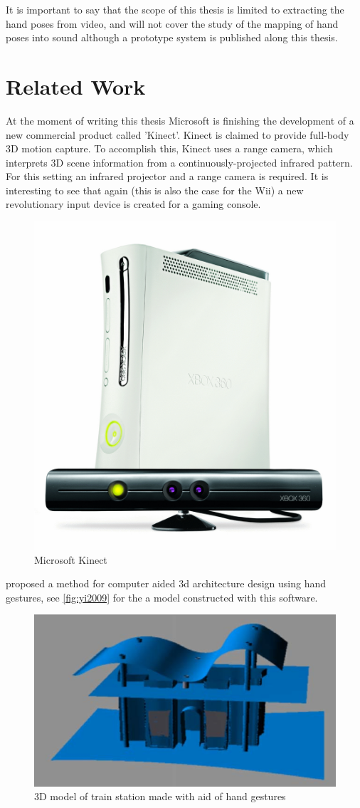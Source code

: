 It is important to say that the scope of this thesis is limited to extracting the hand poses from video, and will not cover the study of the mapping of hand poses into sound although a prototype system is published along this thesis.


\section{Related Work}
At the moment of writing this thesis Microsoft is finishing the development of a new commercial product called 'Kinect'. Kinect is claimed to provide full-body 3D motion capture. To accomplish this, Kinect uses a range camera, which interprets 3D scene information from a continuously-projected infrared pattern. For this setting an infrared projector and a range camera is required. It is interesting to see that again (this is also the case for the Wii) a new revolutionary input device is created for a gaming console. 

\begin{figure}[htbp]
	\center{}
	\includegraphics[width=0.3\linewidth]{figures/wave.jpg}
	\caption{Microsoft Kinect}
	\label{fig:kinect}
\end{figure}

\cite{Yi2009} proposed a method for computer aided 3d architecture design using hand gestures, see \autoref{fig:yi2009} for the a model constructed with this software.

\begin{figure}[htbp]
	\center{}
	\includegraphics[width=0.6\linewidth]{figures/yi2009.png}
	\caption{3D model of train station made with aid of hand gestures}
	\label{fig:yi2009}
\end{figure}




